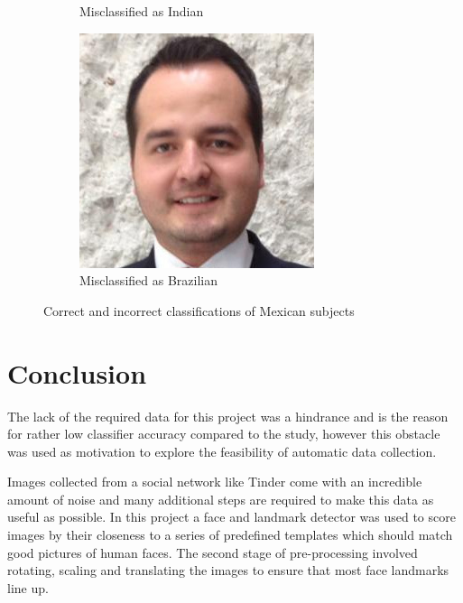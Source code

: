 \begin{figure}[!htb]
\begin{subfigure}[t]{0.3\textwidth}
      \caption{Misclassified as Indian}
    \end{subfigure}
    \begin{subfigure}[t]{0.3\textwidth}
        \includegraphics[width=\textwidth]{figures/results/misclassification/mexico-brazil.jpg}
      \caption{Misclassified as Brazilian}
    \end{subfigure}
\caption{Correct and incorrect classifications of Mexican subjects}
\label{fig:results:dc:misclass:mexico}
\end{figure}

\section{Conclusion}
The lack of the required data for this project was a hindrance and is the
reason for rather low classifier accuracy compared to the \citep{chinesegroups}
study, however this obstacle was used as motivation to explore the feasibility
of automatic data collection.

Images collected from a social network like Tinder come with an incredible
amount of noise and many additional steps are required to make this data as
useful as possible. In this project a face and landmark detector was used to
score images by their closeness to a series of predefined templates which
should match good pictures of human faces. The second stage of pre-processing
involved rotating, scaling and translating the images to ensure that most face
landmarks line up.

